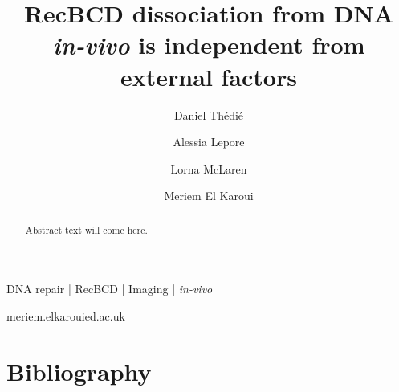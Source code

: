 \documentclass[times, twoside]{zHenriquesLab-StyleBioRxiv}
\begin{document}
\title{RecBCD dissociation from DNA \emph{in-vivo} is independent from external factors}
\shorttitle{}

\author[1]{Daniel Thédié}
\author[2]{Alessia Lepore}
\author[1]{Lorna McLaren}
\author[1]{Meriem El Karoui}



\maketitle

\begin{abstract}
Abstract text will come here.
\end{abstract}

\begin{keywords}
DNA repair | RecBCD | Imaging | \emph{in-vivo}
\end{keywords}

\begin{corrauthor}
meriem.elkaroui\at ed.ac.uk
\end{corrauthor}











\begin{acknowledgements}
\end{acknowledgements}

\section*{Bibliography}


\onecolumn
\newpage


\end{document}
